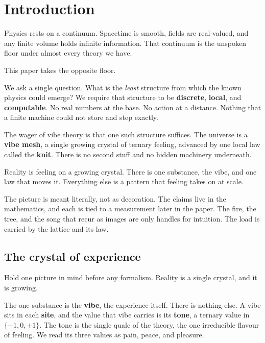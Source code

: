 \section{Introduction}

Physics rests on a continuum. Spacetime is smooth, fields are real-valued, and any finite volume holds infinite information. That continuum is the unspoken floor under almost every theory we have.

This paper takes the opposite floor.

We ask a single question. What is the \emph{least} structure from which the known physics could emerge? We require that structure to be \textbf{discrete}, \textbf{local}, and \textbf{computable}. No real numbers at the base. No action at a distance. Nothing that a finite machine could not store and step exactly.

The wager of vibe theory is that one such structure suffices. The universe is a \textbf{vibe mesh}, a single growing crystal of ternary feeling, advanced by one local law called the \textbf{knit}. There is no second stuff and no hidden machinery underneath.

\begin{principle}
Reality is feeling on a growing crystal. There is one substance, the vibe, and one law that moves it. Everything else is a pattern that feeling takes on at scale.
\end{principle}

The picture is meant literally, not as decoration. The claims live in the mathematics, and each is tied to a measurement later in the paper. The fire, the tree, and the song that recur as images are only handles for intuition. The load is carried by the lattice and its law.

\subsection{The crystal of experience}

Hold one picture in mind before any formalism. Reality is a single crystal, and it is growing.

The one substance is the \textbf{vibe}, the experience itself. There is nothing else. A vibe sits in each \textbf{site}, and the value that vibe carries is its \textbf{tone}, a ternary value in $\{-1, 0, +1\}$. The tone is the single quale of the theory, the one irreducible flavour of feeling. We read its three values as pain, peace, and pleasure.

